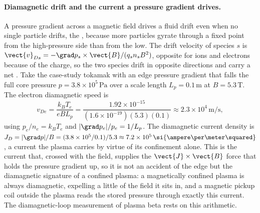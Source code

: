 \paragraph{Diamagnetic drift and the current a pressure gradient drives.}
A pressure gradient across a magnetic field drives a fluid drift even when no
single particle drifts, the , because more particles
gyrate through a fixed point from the high-pressure side than from the low. The
drift velocity of species $s$ is $\vect{v}_{Ds} = -\grad p_s\times\vect{B}/
(q_s n_s B^{2})$, opposite for ions and electrons because of the charge, so the
two species drift in opposite directions and carry a net . Take the case-study tokamak with an edge pressure gradient that falls
the full core pressure $p = 3.8\times 10^{5}\,\si{\pascal}$ over a scale length
$L_p = 0.1\,\si{\meter}$ at $B = 5.3\,\si{\tesla}$. The electron diamagnetic
speed is
\[
v_{De} = \frac{k_B T_e}{eB L_p}
= \frac{1.92\times 10^{-15}}{(1.6\times 10^{-19})(5.3)(0.1)}
\approx 2.3\times 10^{4}\,\si{\meter\per\second},
\]
using $p_e/n_e = k_B T_e$ and $|\grad p_e|/p_e = 1/L_p$. The diamagnetic current
density is $J_D = |\grad p|/B = (3.8\times 10^{5}/0.1)/5.3 \approx 7.2\times
10^{5}\,\si{\ampere\per\meter\squared}$, a current the plasma carries by virtue
of its confinement alone. This is the current that, crossed with the field,
supplies the $\vect{J}\times\vect{B}$ force that holds the pressure gradient up,
so it is not an accident of the edge but the diamagnetic signature of a confined
plasma: a magnetically confined plasma is always diamagnetic, expelling a little
of the field it sits in, and a magnetic pickup coil outside the plasma reads the
stored pressure through exactly this current. The diamagnetic-loop measurement
of plasma beta rests on this arithmetic.

